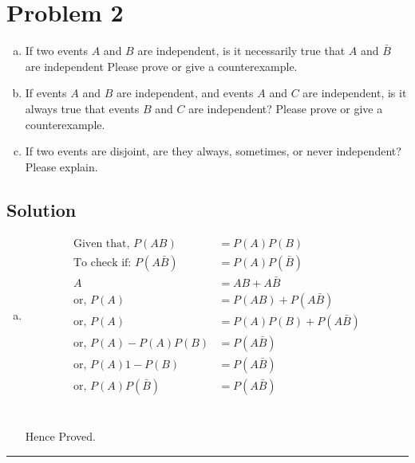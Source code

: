 \section{Problem 2}

\begin{enumerate}[a.]
	\item If two events $A$ and $B$ are independent, is it necessarily true that $A$ and $\bar{B}$ are independent Please prove or give a counterexample.
	\item If events $A$ and $B$ are independent, and events $A$ and $C$ are independent, is it always true that events $B$ and $C$ are independent? Please prove or give a counterexample.
	\item If two events are disjoint, are they always, sometimes, or never independent? Please explain.
\end{enumerate}

\subsection{Solution}
\begin{enumerate}[a.]
	\item
	\begin{align}
		\text{Given that, } P(AB) &= P(A)P(B) \label{eq:given1} \\
		\text{To check if: } P(A\bar{B}) &= P(A)P(\bar{B}) \label{eq:toCheck1} \\
		A &= AB + A\bar{B} \label{eq:LOTPAB}\\
		\text{or, } P(A) &= P(AB) + P(A\bar{B}) \nonumber\\
		\text{or, } P(A) &= P(A)P(B) + P(A\bar{B}) \nonumber\\
		\text{or, } P(A) - P(A)P(B) &= P(A\bar{B}) \nonumber\\
		\text{or, } P(A){1-P(B)} &= P(A\bar{B}) \nonumber\\
		\text{or, } P(A)P(\bar{B}) &= P(A\bar{B}) \nonumber
	\end{align}
	 \\
	\\
	Hence Proved.\Laughey
\end{enumerate} 
\noindent\rule{\textwidth}{1pt}